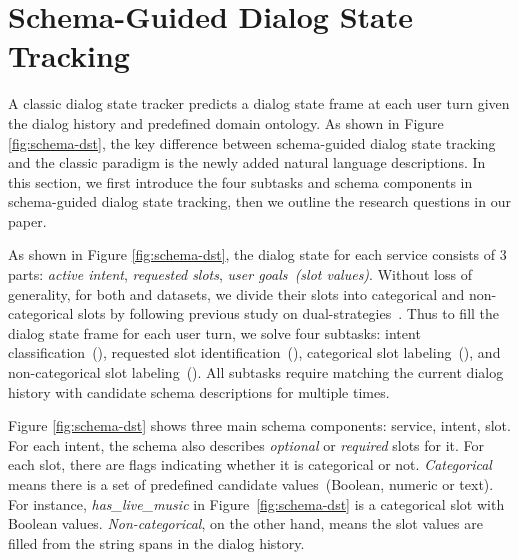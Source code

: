 \section{Schema-Guided Dialog State Tracking}
\label{sec:sgd:chanllenges-in-sgd}
A classic dialog state tracker predicts a dialog state frame at each
user turn given the dialog history and predefined domain ontology. As
shown in Figure \ref{fig:schema-dst}, the key difference between
schema-guided dialog state tracking and the classic paradigm is the
newly added natural language descriptions.  In this section, we first
introduce the four subtasks and schema components in schema-guided
dialog state tracking, then we outline the research questions in our
paper.

 As shown in Figure \ref{fig:schema-dst}, the
dialog state for each service consists of 3 parts: {\it active
  intent}, {\it requested slots}, {\it user goals~(slot
  values)}. Without loss of generality, for both \sgdst and \multiwoz
datasets, we divide their slots into categorical and non-categorical
slots by following previous study on
dual-strategies~\cite{zhang2019find}. Thus to fill the dialog state
frame for each user turn, we solve four  subtasks: intent
classification~(\IC), requested slot identification~(\RSI), categorical
slot labeling~(\CSL), and non-categorical slot labeling~(\NSL). All
subtasks require matching the current dialog history with candidate
schema descriptions for multiple times.

 Figure \ref{fig:schema-dst} shows three
main schema components: service, intent, slot. For each intent, the
schema also describes {\it optional} or {\it required} slots for
it. For each slot, there are flags indicating whether it is
categorical or not. {\it Categorical} means there is a set of
predefined candidate values~(Boolean, numeric or text). For instance,
{\it has\_live\_music} in Figure~\ref{fig:schema-dst} is a categorical
slot with Boolean values. {\it Non-categorical}, on the other hand,
means the slot values are filled from the string spans in the dialog
history.

